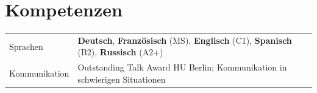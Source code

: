 \documentclass[a4paper,12pt]{article}
\begin{document}
\section{Kompetenzen}
\begin{tabularx}{\linewidth}{@{}l X@{}}
Sprachen &  \normalsize{\textbf{Deutsch}, \textbf{Französisch} (MS), \textbf{Englisch} (C1), \textbf{Spanisch} (B2),} \textbf{Russisch} (A2+)\\
Kommunikation &  \normalsize{Outstanding Talk Award HU Berlin; Kommunikation in schwierigen Situationen}\\  
\end{tabularx}

\vfill
{}
\end{document}
